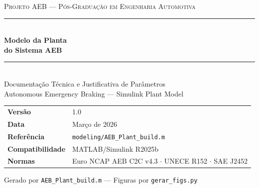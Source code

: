\documentclass[12pt,a4paper]{article}
\begin{document}
\begin{titlepage}
  \pagecolor{azulescuro}
  \color{white}
  \vspace*{2cm}

  \begin{center}
    {\fontsize{11}{13}\selectfont\scshape Projeto AEB --- Pós-Graduação em Engenharia Automotiva}\\[0.8cm]
    \rule{\linewidth}{1.5pt}\\[0.6cm]
    {\fontsize{28}{34}\selectfont\bfseries Modelo da Planta\\do Sistema AEB}\\[0.4cm]
    \rule{\linewidth}{1.5pt}\\[0.8cm]
    {\fontsize{15}{18}\selectfont Documentação Técnica e Justificativa de Parâmetros}\\[0.3cm]
    {\fontsize{12}{15}\selectfont\color{azulclaro}%
      Autonomous Emergency Braking --- Simulink Plant Model}\\[2.5cm]
  \end{center}

  \begin{tcolorbox}[
    colback=azulmedio!60!azulescuro,
    colframe=white!40!azulmedio,
    fontupper=\color{white},
    left=10pt, right=10pt, top=8pt, bottom=8pt
  ]
    \begin{tabular}{ll}
      \textbf{Versão}          & 1.0 \\[3pt]
      \textbf{Data}            & Março de 2026 \\[3pt]
      \textbf{Referência}      & \texttt{modeling/AEB\_Plant\_build.m} \\[3pt]
      \textbf{Compatibilidade} & MATLAB/Simulink R2025b \\[3pt]
      \textbf{Normas}          & Euro NCAP AEB C2C v4.3 $\cdot$ UNECE R152 $\cdot$ SAE J2452 \\
    \end{tabular}
  \end{tcolorbox}

  \vfill
  \begin{center}
    {\small\color{azulclaro}%
      Gerado por \texttt{AEB\_Plant\_build.m} ---
      Figuras por \texttt{gerar\_figs.py}}
  \end{center}
\end{titlepage}

\pagecolor{white}
\color{black}

\tableofcontents
\newpage
\end{document}
